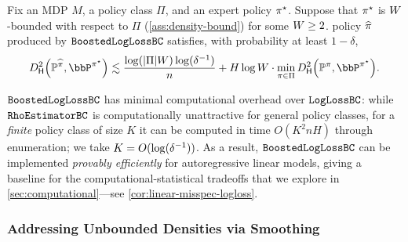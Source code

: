 \begin{corollary}\label{prop:boosted-bc}
Fix an MDP $M$, a policy class $\Pi$, and an expert policy $\pi^{\star}$. Suppose that $\pi^{\star}$ is $W$-bounded with respect to $\Pi$ (\cref{ass:density-bound}) for some $W \geq 2$.  policy $\widehat{\pi}$ produced by $\texttt{BoostedLogLossBC}$ satisfies, with probability at least $1-\delta$,
\begin{equation} \Dhels{\BP^{\pihat}}{\bbP^{\pistar}} \lesssim \frac{\log(|\Pi|\denbound)\log(\delta^{-1})}{n} + H\log{}\denbound \cdot \min_{\pi \in \Pi} \Dhels{\BP^\pi}{\bbP^{\pistar}}.
\end{equation}
\end{corollary}

$\texttt{BoostedLogLossBC}$ has minimal computational overhead over $\texttt{LogLossBC}$: while $\texttt{RhoEstimatorBC}$ is computationally unattractive for general policy classes, for a \emph{finite} policy class of size $K$ it can be computed in time $O(K^2 nH)$ through enumeration; we take $K=O(\log(\delta^{-1}))$. As a result, $\texttt{BoostedLogLossBC}$ can be implemented \emph{provably efficiently} for autoregressive linear models,  giving a baseline for the computational-statistical tradeoffs that we explore in \cref{sec:computational}---see \cref{cor:linear-misspec-logloss}.\loose


\subsubsection{Addressing Unbounded Densities via Smoothing}


